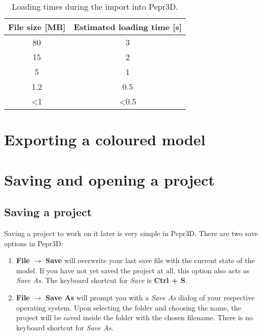 \begin{table}[]
\centering 
\begin{tabular}{|c|c|}
\hline
\textbf{File size {[}MB{]}} & \textbf{Estimated loading time {[}s{]}} \\ \hline
80                          & 3                                   \\ \hline
15                          & 2                                   \\ \hline
5                           & 1                                   \\ \hline
1.2                         & 0.5                                 \\ \hline
\textless{}1                & \textless{}0.5                      \\ \hline
\end{tabular}
\caption{Loading times during the import into Pepr3D.}
\label{tab:loadperf}
\end{table}

\section{Exporting a coloured model}

\section{Saving and opening a project}

\subsection{Saving a project}

Saving a project to work on it later is very simple in Pepr3D. There are two save options in Pepr3D:

\begin{enumerate}
\item \textbf{File} $\rightarrow$ \textbf{Save} will overwrite your last save file with the current state of the model. If you have not yet saved the project at all, this option also acts as \textit{Save As}. The keyboard shortcut for \textit{Save} is \textbf{Ctrl + S}.

\item \textbf{File} $\rightarrow$ \textbf{Save As} will prompt you with a \textit{Save As} dialog of your respective operating system. Upon selecting the folder and choosing the name, the project will be saved inside the folder with the chosen filename. There is no keyboard shortcut for \textit{Save As}.
\end{enumerate}

